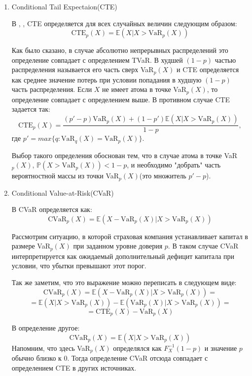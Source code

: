 \documentclass[12pt]{article}
\theoremstyle{plain}
\theoremstyle{definition}
\theoremstyle{remark}
\begin{document}
\begin{enumerate}
    Дальше будет показано, что если $X$ - абсолютно непрерывная случайная величина, то 
    \[
        \frac{1}{1-p}\int_p^1\text{VaR}_q(X)dq = \mathbb{E}(X|X>\text{VaR}_p(X))
    \]
    Поэтому показатель TVAR действительно дает больше информации о больших потерях.

    \item Conditional Tail Expectaion(CTE)

    В \cite{Denuit}, \cite{Desmedt}, \cite{Cousin} CTE определяется для всех случайных величин следующим образом:
    \[
        \text{CTE}_p(X)= \mathbb{E}(X|X > \text{VaR}_p(X))
    \]
    
    Как было сказано, в случае абсолютно непрерывных распределений это определение совпадает с определением TVaR. 
    В \cite{Hardy} худшей $(1-p)$ частью распределения называется его часть сверх VaR$_p(X)$ и CTE определяется как среднее значение потерь при условии попадания в худшую $(1-p)$ часть распределения. Если $X$ не имеет атома в точке VaR$_p(X)$, то определение совпадает с определением выше. В противном случае CTE задается так:
    \[
        \text{CTE}_p(X)=\frac{(p'-p)\text{VaR}_p(X)+(1-p')\mathbb{E}(X|X > \text{VaR}_p(X))}{1-p},
    \]
    где $p' = max\{q: \text{VaR}_q(X) = \text{VaR}_p(X)\}$.
    
    Выбор такого определения обоснован тем, что в случае атома в точке VaR$_p(X)$, $\mathbb{P}(X>\text{VaR}_p(X)) < 1 - p$, и необходимо "добрать" часть вероятностной массы из точки VaR$_p(X)$(это множитель $p'-p$).

    \item Conditional Value-at-Risk(CVaR)
    
    В \cite{Denuit} CVaR определяется как:
    \[
        \text{CVaR}_p(X)=\mathbb{E}(X-\text{VaR}_p(X)|X > \text{VaR}_p(X))
    \]
    
    Рассмотрим ситуацию, в которой страховая компания устанавливает капитал в размере VaR$_p(X)$ при заданном уровне доверия $p$. В таком случае CVaR интерпретируется как ожидаемый дополнительный дефицит капитала при условии, что убытки превышают этот порог.

    Так же заметим, что это выражение можно переписать в следующем виде:
    \[
        \text{CVaR}_p(X)=\mathbb{E}(X-\text{VaR}_p(X)|X > \text{VaR}_p(X)) = 
    \]
    \[
        = \mathbb{E}(X|X > \text{VaR}_p(X)) - \mathbb{E}(\text{VaR}_p(X)|X > \text{VaR}_p(X)) = 
    \]
    \[
        =\text{CTE}_p(X) - \text{VaR}_p(X)
    \]
    
    В \cite{Albrecht} определение другое:
    \[
         \text{CVaR}_p(X)=\mathbb{E}(X|X > \text{VaR}_p(X))
    \]
    Напомним, что здесь VaR$_p(X)$ определялся как $F_X^{-1}(1-p)$ и значение $p$ обычно близко к 0. Тогда определение CVaR отсюда совпадает с определением CTE в других источниках.


\end{enumerate}
\end{document}
